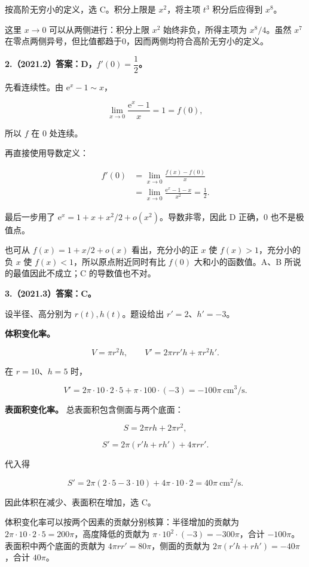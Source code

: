 \documentclass[UTF8,11pt,fontset=windows]{ctexart}
\begin{document}
按高阶无穷小的定义，选 C。积分上限是 $x^2$，将主项 $t^3$ 积分后应得到 $x^8$。

这里 $x\to0$ 可以从两侧进行：积分上限 $x^2$ 始终非负，所得主项为 $x^8/4$。虽然 $x^7$ 在零点两侧异号，但比值都趋于0，因而两侧均符合高阶无穷小的定义。

\clearpage

\textbf{2.（2021.2）答案：D，$f'(0)=\dfrac12$。}

先看连续性。由 $\mathrm e^x-1\sim x$，

$$
\lim_{x\to0}\frac{\mathrm e^x-1}{x}=1=f(0),
$$

所以 $f$ 在 $0$ 处连续。

再直接使用导数定义：

$$
\begin{aligned}
f'(0)
&=\lim_{x\to0}\frac{f(x)-f(0)}x\\
&=\lim_{x\to0}\frac{\mathrm e^x-1-x}{x^2}
=\frac12.
\end{aligned}
$$

最后一步用了 $\mathrm e^x=1+x+x^2/2+o(x^2)$。导数非零，因此 D 正确，$0$ 也不是极值点。

也可从 $f(x)=1+x/2+o(x)$ 看出，充分小的正 $x$ 使 $f(x)>1$，充分小的负 $x$ 使 $f(x)<1$，所以原点附近同时有比 $f(0)$ 大和小的函数值。A、B 所说的最值因此不成立；C 的导数值也不对。

\clearpage

\textbf{3.（2021.3）答案：C。}

设半径、高分别为 $r(t),h(t)$。题设给出 $r'=2$、$h'=-3$。

\textbf{体积变化率。}

$$
V=\pi r^2h,
\qquad V'=2\pi rr'h+\pi r^2h'.
$$

在 $r=10$、$h=5$ 时，

$$
V'=2\pi\cdot10\cdot2\cdot5+\pi\cdot100\cdot(-3)
=-100\pi\ \mathrm{cm^3/s}.
$$

\textbf{表面积变化率。} 总表面积包含侧面与两个底面：

$$
S=2\pi rh+2\pi r^2,
$$

$$
S'=2\pi(r'h+rh')+4\pi rr'.
$$

代入得

$$
S'=2\pi(2\cdot5-3\cdot10)+4\pi\cdot10\cdot2
=40\pi\ \mathrm{cm^2/s}.
$$

因此体积在减少、表面积在增加，选 C。

体积变化率可以按两个因素的贡献分别核算：半径增加的贡献为 $2\pi\cdot10\cdot2\cdot5=200\pi$，高度降低的贡献为 $\pi\cdot10^2\cdot(-3)=-300\pi$，合计 $-100\pi$。表面积中两个底面的贡献为 $4\pi rr'=80\pi$，侧面的贡献为 $2\pi(r'h+rh')=-40\pi$，合计 $40\pi$。
\end{document}
